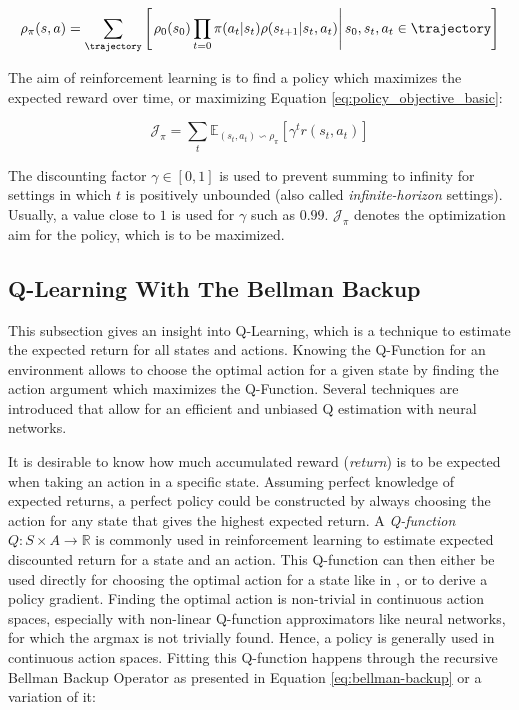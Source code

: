 \begin{equation}
  \rho_{\pi}(s, a) = \sum_{\trajectory} \left[ \left. \rho_0(s_0) \prod_{t=0} \pi(a_t | s_t) \rho(s_{t+1}|s_t, a_t) \right| s_0, s_t, a_t \in \trajectory \right]
  \label{eq:state-action-marginals}
\end{equation}

The aim of reinforcement learning is to find a policy which maximizes the expected reward over time, or maximizing Equation \ref{eq:policy_objective_basic}:

\begin{equation}
\label{eq:policy_objective_basic}
\mathcal{J}_{\pi} = \sum_t \mathbb{E}_{(s_t, a_t) \backsim \rho_{\pi}} [\gamma^t r(s_t, a_t)]
\end{equation}

The discounting factor $\gamma \in [0,1]$ is used to prevent summing to infinity for settings in which $t$ is positively unbounded (also called \textit{infinite-horizon} settings). Usually, a value close to $1$ is used for $\gamma$ such as $0.99$. $\mathcal{J}_{\pi}$ denotes the optimization aim for the policy, which is to be maximized.


\subsection{Q-Learning With The Bellman Backup}
\label{section:background-q-learning}

\begin{summary}
This subsection gives an insight into Q-Learning, which is a technique to estimate the expected return for all states and actions. Knowing the Q-Function for an environment allows to choose the optimal action for a given state by finding the action argument which maximizes the Q-Function. Several techniques are introduced that allow for an efficient and unbiased Q estimation with neural networks.
\end{summary}

It is desirable to know how much accumulated reward (\textit{return}) is to be expected when taking an action in a specific state. Assuming perfect knowledge of expected returns, a perfect policy could be constructed by always choosing the action for any state that gives the highest expected return. A \textit{Q-function} $Q : S \times A \rightarrow \mathbb{R}$ is commonly used in reinforcement learning to estimate expected discounted return for a state and an action. This Q-function can then either be used directly for choosing the optimal action for a state like in \citet{mnihHumanlevelControlDeep2015}, or to derive a policy gradient. Finding the optimal action is non-trivial in continuous action spaces, especially with non-linear Q-function approximators like neural networks, for which the argmax is not trivially found. Hence, a policy is generally used in continuous action spaces. Fitting this Q-function happens through the recursive Bellman Backup Operator \cite{richardbellmanTheoryDynamicProgramming1954} as presented in Equation \ref{eq:bellman-backup} or a variation of it:

